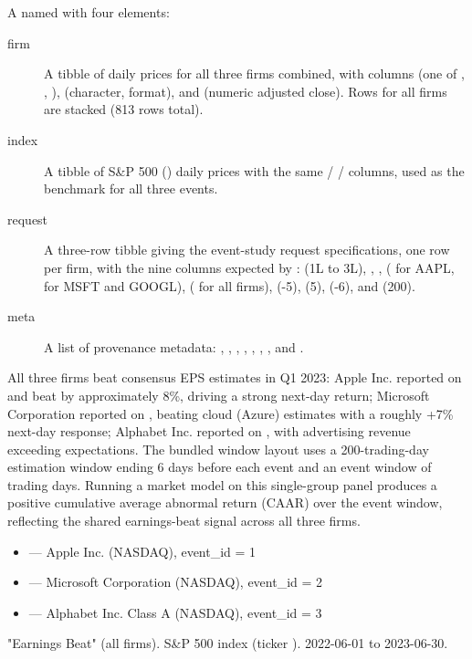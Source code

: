 \documentclass[a4paper]{book}
\begin{document}
%
\begin{Format}
A named  with four elements:
\begin{description}

\item[firm] A tibble of daily prices for all three firms combined,
with columns  (one of , ,
),  (character,
 format), and  (numeric adjusted
close). Rows for all firms are stacked (813 rows total).
\item[index] A tibble of S\&P 500 () daily prices with the
same  /  /  columns, used as the
benchmark for all three events.
\item[request] A three-row tibble giving the event-study request
specifications, one row per firm, with the nine columns expected by
:  (1L to 3L),
, , 
( for AAPL,  for MSFT and GOOGL),
 ( for all firms),
 (-5),  (5),
 (-6), and
 (200).
\item[meta] A list of provenance metadata: ,
, , , ,
, , and .

\end{description}

\end{Format}
%
\begin{Details}
All three firms beat consensus EPS estimates in Q1 2023: Apple Inc. reported
on  and beat by approximately 8\%, driving a strong
next-day return; Microsoft Corporation reported on ,
beating cloud (Azure) estimates with a roughly +7\% next-day response;
Alphabet Inc. reported on , with advertising revenue
exceeding expectations. The bundled window layout uses a 200-trading-day
estimation window ending 6 days before each event and an event window of
\code{[-5, +5]} trading days. Running a market model on this single-group
panel produces a positive cumulative average abnormal return (CAAR) over the
event window, reflecting the shared earnings-beat signal across all three firms.


\begin{itemize}

\item{}  — Apple Inc. (NASDAQ), event\_id = 1
\item{}  — Microsoft Corporation (NASDAQ), event\_id = 2
\item{}  — Alphabet Inc. Class A (NASDAQ), event\_id = 3

\end{itemize}

 "Earnings Beat" (all firms).
 S\&P 500 index (ticker ).
 2022-06-01 to 2023-06-30.
\end{Details}
\end{document}
